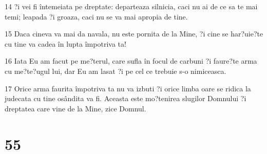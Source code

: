 \par 14 ?i vei fi întemeiata pe dreptate: departeaza silnicia, caci nu ai de ce sa te mai temi; leapada ?i groaza, caci nu se va mai apropia de tine.
\par 15 Daca cineva va mai da navala, nu este pornita de la Mine, ?i cine se har?uie?te cu tine va cadea în lupta împotriva ta!
\par 16 Iata Eu am facut pe me?terul, care sufla în focul de carbuni ?i faure?te arma cu me?te?ugul lui, dar Eu am lasat ?i pe cel ce trebuie s-o nimiceasca.
\par 17 Orice arma faurita împotriva ta nu va izbuti ?i orice limba oare se ridica la judecata cu tine osândita va fi. Aceasta este mo?tenirea slugilor Domnului ?i dreptatea care vine de la Mine, zice Domnul.

\chapter{55}

